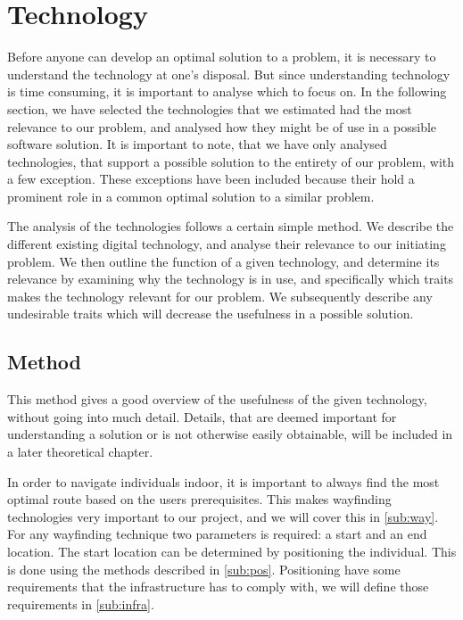 
\section{Technology} \label{tech}

Before anyone can develop an optimal solution to a problem, it is necessary to understand the technology at one's disposal. But since understanding technology is time consuming, it is important to analyse which to focus on. In the following section, we have selected the technologies that we estimated had the most relevance to our problem, and analysed how they might be of use in a possible software solution. It is important to note, that we have only analysed technologies, that support a possible solution to the entirety of our problem, with a few exception. These exceptions have been included because their hold a prominent role in a common optimal solution to a similar problem.

The analysis of the technologies follows a certain simple method. We describe the different existing digital technology, and analyse their relevance to our initiating problem. We then outline the function of a given technology, and determine its relevance by examining why the technology is in use, and specifically which traits makes the technology relevant for our problem. We subsequently describe any undesirable traits which will decrease the usefulness in a possible solution.

\subsection{Method} \label{sub:techmethod}
This method gives a good overview of the usefulness of the given technology, without going into much detail. Details, that are deemed important for understanding a solution or is not otherwise easily obtainable, will be included in a later theoretical chapter.

In order to navigate individuals indoor, it is important to always find the most optimal route based on the users prerequisites. This makes wayfinding technologies very important to our project, and we will cover this in \cref{sub:way}. For any wayfinding technique two parameters is required: a start and an end location. The start location can be determined by positioning the individual. This is done using the methods described in \cref{sub:pos}. Positioning have some requirements that the infrastructure has to comply with, we will define those requirements in \cref{sub:infra}.



